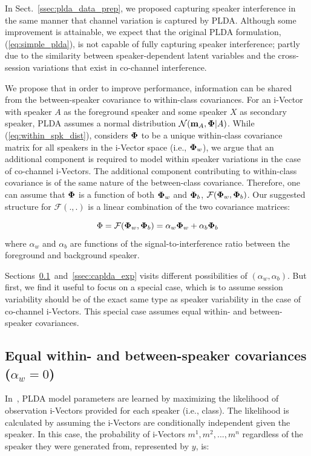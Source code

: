 In Sect.~\ref{ssec:plda_data_prep}, we proposed capturing speaker interference in the same manner that channel variation is captured by PLDA. 
Although some improvement is attainable, we expect that the original PLDA formulation, (\ref{eq:simple_plda}), is not capable of fully capturing speaker interference; partly due to the similarity between speaker-dependent latent variables and the cross-session variations that exist in co-channel interference. 

We propose that in order to improve performance, information can be shared from the between-speaker covariance to within-class covariances. 
For an i-Vector with speaker $A$ as the foreground speaker and some speaker $X$ as secondary speaker, PLDA assumes a normal distribution $\mathcal{N} ({\bf m}_A,{\bf \Phi} | A)$. 
While (\ref{eq:within_spk_dist}), considers ${\bf \Phi}$ to be a unique within-class covariance matrix for all speakers in the i-Vector space (i.e., ${\bf \Phi}_w$), we argue that an additional component is required to model within speaker variations in the case of co-channel i-Vectors. 
The additional component contributing to within-class covariance is of the same nature of the between-class covariance. 
Therefore, one can assume that ${\bf \Phi}$ is a function of both ${\bf \Phi}_w$ and ${\bf \Phi}_b$, $ \mathcal{F} ({\bf \Phi}_w,{\bf \Phi}_b)$. 
Our suggested structure for $ \mathcal{F} (.,.)$ is a linear combination of the two covariance matrices: 

\begin{equation}
\label{eq:complex_phiw}
\Phi = \mathcal{F} ({\bf \Phi}_w,{\bf \Phi}_b) = 
\alpha_w{\bf \Phi}_w + \alpha_b{\bf \Phi}_b
\end{equation}
where $\alpha_w$ and $\alpha_b$ are functions of the signal-to-interference ratio between the foreground and background speaker. 

Sections~\ref{ssec:alpha_w_0}~and~\ref{ssec:caplda_exp} visits different possibilities of $(\alpha_w, \alpha_b)$. But first, we find it useful to focus on a special case, which is to assume session variability should be of the exact same type as speaker variability in the case of co-channel i-Vectors. 
This special case assumes equal within- and between-speaker covariances. 

\subsection{Equal within- and between-speaker covariances ($\alpha_w = 0$)}
\label{ssec:alpha_w_0}
In~\cite{ioffePLDA2006}, PLDA model parameters are learned by maximizing the likelihood of observation i-Vectors provided for each speaker (i.e., class). 
The likelihood is calculated by assuming the i-Vectors are conditionally independent given the speaker. 
In this case, the probability of i-Vectors $m^1, m^2, ..., m^n$ regardless of the speaker they were generated from, represented by $y$, is:

